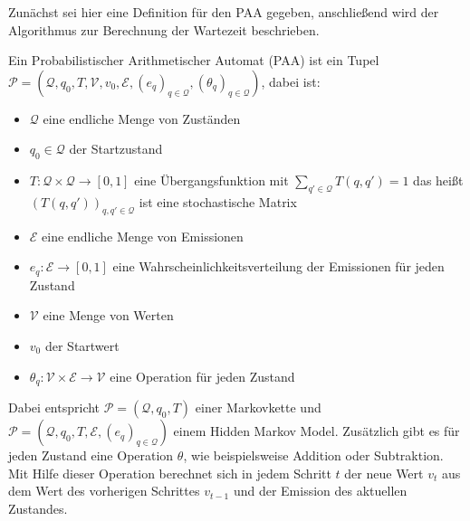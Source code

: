 Zunächst sei hier eine Definition für den PAA gegeben, anschließend wird der Algorithmus zur Berechnung der Wartezeit beschrieben.


\begin{definition}[PAA]
 Ein Probabilistischer Arithmetischer Automat (PAA) ist ein Tupel
 $ \mathcal{P} = (\mathcal{Q}, q_0, T, \mathcal{V}, v_0, \mathcal{E}, (e_q)_{q\in\mathcal{Q}}, (\theta_q)_{q\in\mathcal{Q}})$, dabei ist:
 \begin{itemize}
  \item $\mathcal{Q}$ eine endliche Menge von Zuständen
  \item $q_0 \in \mathcal{Q}$ der Startzustand
  \item $T: \mathcal{Q} \times \mathcal{Q} \rightarrow [0,1]$ eine Übergangsfunktion mit $\sum_{q' \in \mathcal{Q}} T(q, q') = 1 $ das heißt $(T(q,q'))_{q,q' \in \mathcal{Q}}$ ist eine stochastische Matrix
  \item $\mathcal{E}$ eine endliche Menge von Emissionen
  \item $e_q: \mathcal{E} \rightarrow [0,1]$ eine Wahrscheinlichkeitsverteilung der Emissionen für jeden Zustand
  \item $\mathcal{V}$ eine Menge von Werten
  \item $v_0$ der Startwert
  \item $\theta_q: \mathcal{V} \times \mathcal{E} \rightarrow \mathcal{V}$ eine Operation für jeden Zustand
 \end{itemize}
\end{definition}
Dabei entspricht $ \mathcal{P} = (\mathcal{Q}, q_0, T)$ einer Markovkette und $ \mathcal{P} = (\mathcal{Q}, q_0, T, \mathcal{E}, (e_q)_{q\in\mathcal{Q}})$ einem Hidden Markov Model. %
Zusätzlich gibt es für jeden Zustand eine Operation $\theta$, wie beispielsweise Addition oder Subtraktion. Mit Hilfe dieser Operation berechnet sich in jedem Schritt $t$ der neue Wert $v_t$ aus dem Wert des vorherigen Schrittes $v_{t-1}$ und der Emission des aktuellen Zustandes.

